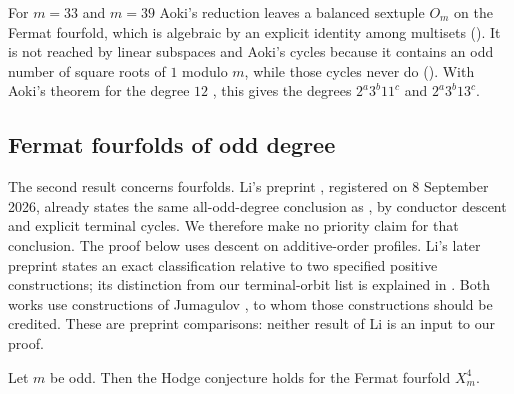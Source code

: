 For $m=33$ and $m=39$ Aoki's reduction leaves a balanced sextuple $O_{m}$ on
the Fermat fourfold, which is algebraic by an explicit identity among
multisets (). It is not reached by linear subspaces and
Aoki's cycles because it contains an odd number of square roots of $1$
modulo $m$, while those cycles never do (). With Aoki's
theorem for the degree $12$ \cite{Aok00}, this gives the degrees
$2^{a}3^{b}11^{c}$ and $2^{a}3^{b}13^{c}$.

\subsection*{Fermat fourfolds of odd degree}
The second result concerns fourfolds. Li's preprint
\cite[Theorem~1.1]{Li26a}, registered on 8 September 2026,
already states the same all-odd-degree conclusion as
, by conductor descent and explicit terminal cycles.
We therefore make no priority claim for that conclusion. The proof below
uses descent on additive-order profiles. Li's later preprint
\cite[Theorem~A and Theorem~7.20]{Li26b} states an exact classification
relative to two specified positive constructions; its distinction from
our terminal-orbit list is explained in .
Both works use constructions of Jumagulov \cite{Jum26}, to whom those
constructions should be credited. These are preprint comparisons:
neither result of Li is an input to our proof.

\begin{maintheorem}\label{thm:oddfour}
Let $m$ be odd. Then the Hodge conjecture holds for the Fermat fourfold
$X^{4}_{m}$.
\end{maintheorem}

